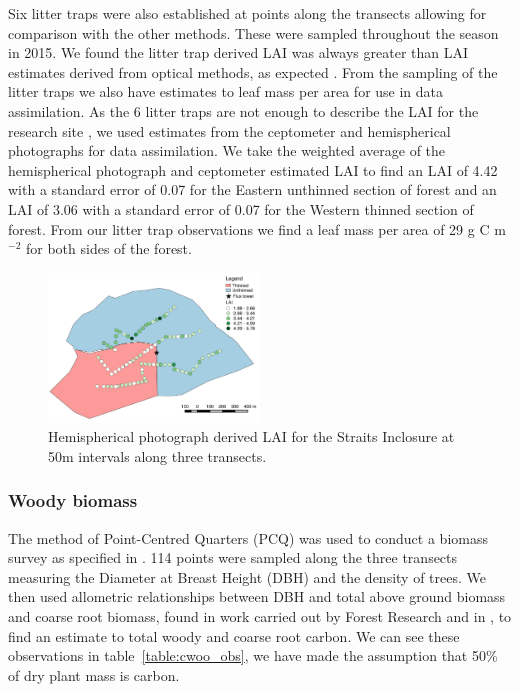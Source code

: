 \documentclass[11pt]{article}
\begin{document}
Six litter traps were also established at points along the transects allowing for comparison with the other methods. These were sampled throughout the season in 2015. We found the litter trap derived LAI was always greater than LAI estimates derived from optical methods, as expected \citep{breda2003ground}. From the sampling of the litter traps we also have estimates to leaf mass per area for use in data assimilation. As the 6 litter traps are not enough to describe the LAI for the research site \citep{kimmins1973some}, we used estimates from the ceptometer and hemispherical photographs for data assimilation. We take the weighted average of the hemispherical photograph and ceptometer estimated LAI to find an LAI of 4.42 with a standard error of 0.07 for the Eastern unthinned section of forest and an LAI of 3.06 with a standard error of 0.07 for the Western thinned section of forest. From our litter trap observations we find a leaf mass per area of 29 g C m\(^{-2}\) for both sides of the forest.


\begin{figure}[ht]
    \centering
    \includegraphics[width=0.5\textwidth]{thinned.pdf}
    \caption{Hemispherical photograph derived LAI for the Straits Inclosure at 50m intervals along three transects.} \label{fig:hemi_lai}
\end{figure}

\subsubsection{Woody biomass}  
The method of Point-Centred Quarters (PCQ) was used to conduct a biomass survey as specified in \citet{dahdouh2006empirical}. 114 points were sampled along the three transects measuring the Diameter at Breast Height (DBH) and the density of trees. We then used allometric relationships between DBH and total above ground biomass and coarse root biomass, found in work carried out by Forest Research and in \citet{mckay2003woodfuel}, to find an estimate to total woody and coarse root carbon. We can see these observations in table~\ref{table:cwoo_obs}, we have made the assumption that 50\% of dry plant mass is carbon.
\end{document}
